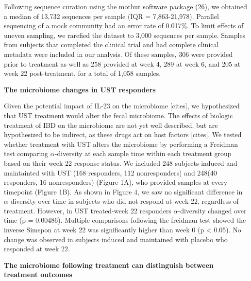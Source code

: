 \documentclass[11pt,]{article}
\begin{document}
Following sequence curation using the mothur software package (26), we
obtained a median of 13,732 sequences per sample (IQR = 7,863-21,978).
Parallel sequencing of a mock community had an error rate of 0.017\%. To
limit effects of uneven sampling, we rarefied the dataset to 3,000
sequences per sample. Samples from subjects that completed the clinical
trial and had complete clinical metadata were included in our analysis.
Of these samples, 306 were provided prior to treatment as well as 258
provided at week 4, 289 at week 6, and 205 at week 22 post-treatment,
for a total of 1,058 samples.

\textbf{The microbiome changes in UST responders}

Given the potential impact of IL-23 on the microbiome {[}cites{]}, we
hypothesized that UST treatment would alter the fecal microbiome. The
effects of biologic treatment of IBD on the microbiome are not yet well
described, but are hypothesized to be indirect, as these drugs act on
host factors {[}cites{]}. We tested whether treatment with UST alters
the microbiome by performing a Freidman test comparing
\({\alpha}\)-diversity at each sample time within each treatment group
based on their week 22 response status. We included 248 subjects induced
and maintainted with UST (168 responders, 112 nonresponders) and 248(40
responders, 16 nonresponders) (Figure 1A), who provided samples at every
timepoint (Figure 1B). As shown in Figure 4, we saw no significant
difference in \({\alpha}\)-diversity over time in subjects who did not
respond at week 22, regardless of treatment. However, in UST
treated-week 22 responders \({\alpha}\)-diversity changed over time (p =
0.00486). Multiple comparisons following the freidman test showed the
inverse Simspon at week 22 was significantly higher than week 0 (p
\textless{} 0.05). No change was observed in subjects induced and
maintained with placebo who responded at week 22.

\textbf{The microbiome following treatment can distinguish between
treatment outcomes}
\end{document}

